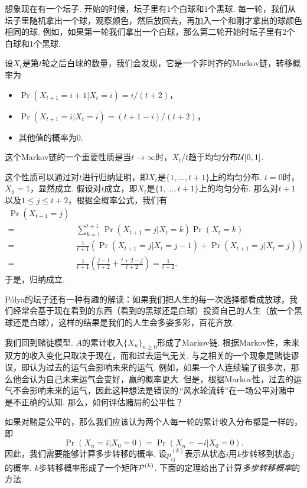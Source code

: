 \begin{example}[Pólya的坛子]
想象现在有一个坛子. 开始的时候，坛子里有$1$个白球和$1$个黑球. 每一轮，我们从坛子里随机拿出一个球，观察颜色，然后放回去，再加入一个和刚才拿出的球颜色相同的球. 例如，如果第一轮我们拿出一个白球，那么第二轮开始时坛子里有$2$个白球和$1$个黑球. 

设$X_t$是第$t$轮之后白球的数量，我们会发现，它是一个非时齐的Markov链，转移概率为
\begin{itemize}
    \item $\Pr(X_{t+1}=i+1|X_t=i)=i/(t+2)$，
    \item $\Pr(X_{t+1}=i|X_t=i)=(t+1-i)/(t+2)$，
    \item 其他值的概率为$0$. 
\end{itemize}
这个Markov链的一个重要性质是当$t\to\infty$时，$X_t/t$趋于均匀分布$\mathcal{U}[0,1]$. 

这个性质可以通过对$t$进行归纳证明，即$X_t$是$\{1,\dots,t+1\}$上的均匀分布. $t=0$时，$X_0=1$，显然成立. 假设对$t$成立，即$X_t$是$\{1,\dots,t+1\}$上的均匀分布. 那么对$t+1$以及$1\leq j\leq t+2$，根据全概率公式，我们有
\begin{align*}
    \Pr(X_{t+1}=j)\\
    =&\sum_{k=1}^{t+1}\Pr(X_{t+1}=j|X_t=k)\Pr(X_t=k)\\
    =&\frac{1}{t+1}(\Pr(X_{t+1}=j|X_t=j-1)+\Pr(X_{t+1}=j|X_t=j))\\
    =&\frac{1}{t+1}\left(\frac{j-1}{t+2}+\frac{t+2-j}{t+2}\right)=\frac{1}{t+2}.
\end{align*}
于是，归纳成立.

Pólya的坛子还有一种有趣的解读：如果我们把人生的每一次选择都看成放球，我们经常会基于现在看到的东西（看到的黑球还是白球）投资自己的人生（放一个黑球还是白球），这样的结果是我们的人生会多姿多彩，百花齐放. 
\end{example}

我们回到赌徒模型. $A$的累计收入$\{X_n\}_{n\geq 0}$形成了Markov链. 根据Markov性，未来双方的收入变化只取决于现在，而和过去运气无关. 与之相关的一个现象是赌徒谬误，即认为过去的运气会影响未来的运气. 例如，如果一个人连续输了很多次，那么他会认为自己未来运气会变好，赢的概率更大. 但是，根据Markov性，过去的运气不会影响未来的运气，因此这种想法是错误的.“风水轮流转”在一场公平对赌中是不正确的认知. 那么，如何评估赌局的公平性？

如果对赌是公平的，那么我们应该认为两个人每一轮的累计收入分布都是一样的，即
    \[\Pr(X_n=i|X_0=0)=\Pr(X_n=-i|X_0=0).\]
因此，我们需要能够计算多步转移的概率. 设$p_{ij}^{(k)}$表示从状态$i$用$k$步转移到状态$j$的概率. $k$步转移概率形成了一个矩阵$\mathcal P^{(k)}$. 下面的定理给出了计算\textit{多步转移概率}的方法.


